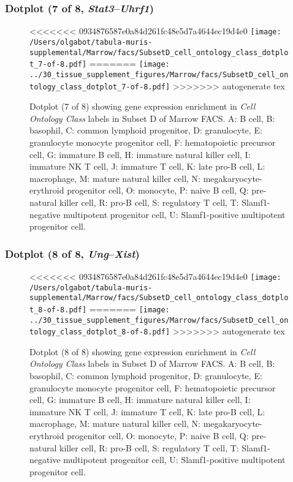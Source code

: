 \clearpage

\subsubsection{Dotplot (7 of 8, \emph{Stat3}--\emph{Uhrf1})}
\begin{figure}[h]
\centering
<<<<<<< 0934876587e0a84d261fc48e5d7a4644ec19d4e0
\texttt{[image: /Users/olgabot/tabula-muris-supplemental/Marrow/facs/SubsetD\_cell\_ontology\_class\_dotplot\_7-of-8.pdf]}
=======
\texttt{[image: ../30\_tissue\_supplement\_figures/Marrow/facs/SubsetD\_cell\_ontology\_class\_dotplot\_7-of-8.pdf]}
>>>>>>> autogenerate tex

\caption{ Dotplot (7 of 8)  showing gene expression enrichment in \emph{Cell Ontology Class} labels in Subset D of Marrow FACS. A: B cell, B: basophil, C: common lymphoid progenitor, D: granulocyte, E: granulocyte monocyte progenitor cell, F: hematopoietic precursor cell, G: immature B cell, H: immature natural killer cell, I: immature NK T cell, J: immature T cell, K: late pro-B cell, L: macrophage, M: mature natural killer cell, N: megakaryocyte-erythroid progenitor cell, O: monocyte, P: naive B cell, Q: pre-natural killer cell, R: pro-B cell, S: regulatory T cell, T: Slamf1-negative multipotent progenitor cell, U: Slamf1-positive multipotent progenitor cell.}
\end{figure}


\clearpage

\subsubsection{Dotplot (8 of 8, \emph{Ung}--\emph{Xist})}
\begin{figure}[h]
\centering
<<<<<<< 0934876587e0a84d261fc48e5d7a4644ec19d4e0
\texttt{[image: /Users/olgabot/tabula-muris-supplemental/Marrow/facs/SubsetD\_cell\_ontology\_class\_dotplot\_8-of-8.pdf]}
=======
\texttt{[image: ../30\_tissue\_supplement\_figures/Marrow/facs/SubsetD\_cell\_ontology\_class\_dotplot\_8-of-8.pdf]}
>>>>>>> autogenerate tex

\caption{ Dotplot (8 of 8)  showing gene expression enrichment in \emph{Cell Ontology Class} labels in Subset D of Marrow FACS. A: B cell, B: basophil, C: common lymphoid progenitor, D: granulocyte, E: granulocyte monocyte progenitor cell, F: hematopoietic precursor cell, G: immature B cell, H: immature natural killer cell, I: immature NK T cell, J: immature T cell, K: late pro-B cell, L: macrophage, M: mature natural killer cell, N: megakaryocyte-erythroid progenitor cell, O: monocyte, P: naive B cell, Q: pre-natural killer cell, R: pro-B cell, S: regulatory T cell, T: Slamf1-negative multipotent progenitor cell, U: Slamf1-positive multipotent progenitor cell.}
\end{figure}


